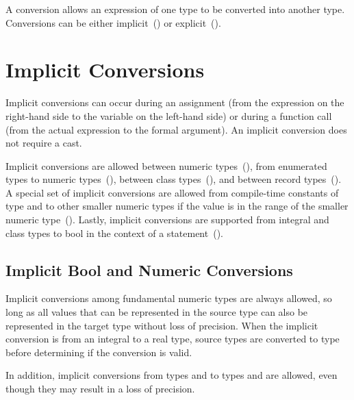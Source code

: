 \label{Conversions}

A conversion allows an expression of one type to be converted into
another type.  Conversions can be either
implicit~() or
explicit~().

\section{Implicit Conversions}
\label{Implicit_Conversions}

Implicit conversions can occur during an assignment (from the
expression on the right-hand side to the variable on the left-hand
side) or during a function call (from the actual expression to the
formal argument).  An implicit conversion does not require a cast.

Implicit conversions are allowed between numeric
types~(), from enumerated types to
numeric types~(), between class
types~(), and between record
types~().  A special set of implicit
conversions are allowed from compile-time constants of type 
and  to other smaller numeric types if the value is in
the range of the smaller numeric
type~().  Lastly,
implicit conversions are supported from integral and class types to
bool in the context of a
statement~().

\subsection{Implicit Bool and Numeric Conversions}
\label{Implicit_Numeric_Conversions}

Implicit conversions among fundamental numeric types are always allowed, so long as all
values that can be represented in the source type can also be represented in the
target type without loss of precision.
When the implicit conversion is from an integral to a real type, source
types are converted to type  before determining if the
conversion is valid.

In addition, implicit conversions from
types  and  to types 
and  are allowed, even though they may result in a loss of
precision.

